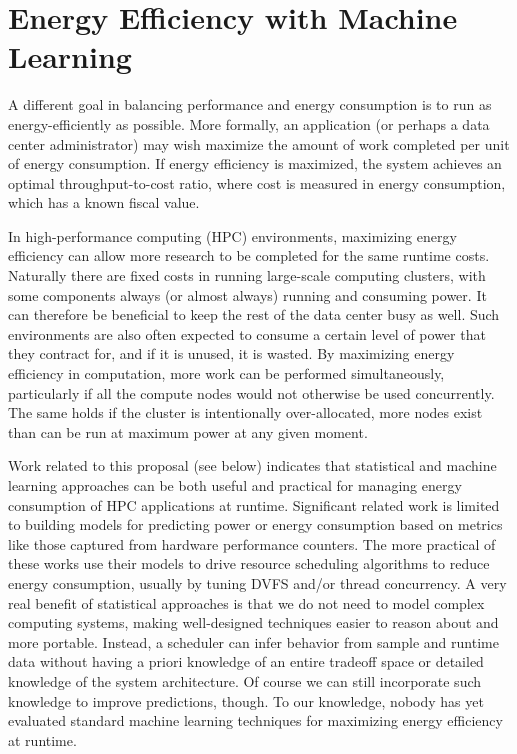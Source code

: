 \section{Energy Efficiency with Machine Learning}

A different goal in balancing performance and energy consumption is to run as energy-efficiently as possible.
More formally, an application (or perhaps a data center administrator) may wish maximize the amount of work completed per unit of energy consumption.
If energy efficiency is maximized, the system achieves an optimal throughput-to-cost ratio, where cost is measured in energy consumption, which has a known fiscal value.

In high-performance computing (HPC) environments, maximizing energy efficiency can allow more research to be completed for the same runtime costs.
Naturally there are fixed costs in running large-scale computing clusters, with some components always (or almost always) running and consuming power.
It can therefore be beneficial to keep the rest of the data center busy as well.
Such environments are also often expected to consume a certain level of power that they contract for, and if it is unused, it is wasted.
By maximizing energy efficiency in computation, more work can be performed simultaneously, particularly if all the compute nodes would not otherwise be used concurrently.
The same holds if the cluster is intentionally over-allocated, \ie more nodes exist than can be run at maximum power at any given moment.

Work related to this proposal (see below) indicates that statistical and machine learning approaches can be both useful and practical for managing energy consumption of HPC applications at runtime.
Significant related work is limited to building models for predicting power or energy consumption based on metrics like those captured from hardware performance counters.
The more practical of these works use their models to drive resource scheduling algorithms to reduce energy consumption, usually by tuning DVFS and/or thread concurrency.
A very real benefit of statistical approaches is that we do not need to model complex computing systems, making well-designed techniques easier to reason about and more portable.
Instead, a scheduler can infer behavior from sample and runtime data without having a priori knowledge of an entire tradeoff space or detailed knowledge of the system architecture.
Of course we can still incorporate such knowledge to improve predictions, though.
To our knowledge, nobody has yet evaluated standard machine learning techniques for maximizing energy efficiency at runtime.


